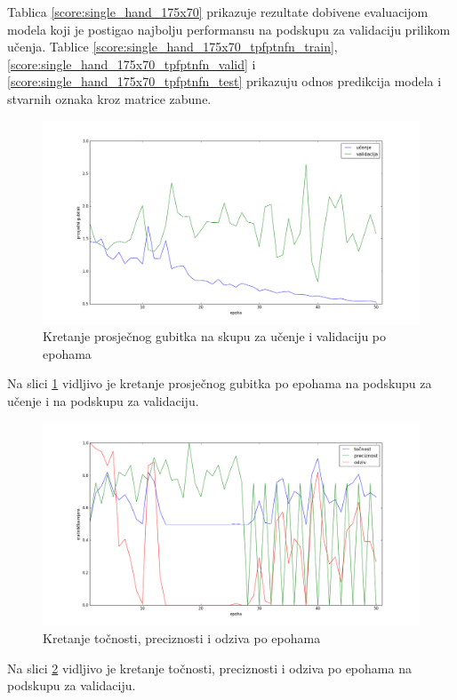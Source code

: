 \documentclass[times, utf8, diplomski, numeric]{fer}
\begin{document}
\noindent Tablica \ref{score:single_hand_175x70} prikazuje rezultate dobivene evaluacijom modela koji je postigao najbolju performansu na podskupu za validaciju prilikom učenja.
Tablice \ref{score:single_hand_175x70_tpfptnfn_train}, \ref{score:single_hand_175x70_tpfptnfn_valid} i \ref{score:single_hand_175x70_tpfptnfn_test} prikazuju odnos predikcija modela i stvarnih oznaka kroz matrice zabune.

\begin{figure}[H]
\centering
\includegraphics[scale=0.35]{images/single_hand_scale025_loss.png}
\caption{Kretanje prosječnog gubitka na skupu za učenje i validaciju po epohama}
\label{img:single_hand_scale025_loss}
\end{figure}
\noindent Na slici \ref{img:single_hand_scale025_loss} vidljivo je kretanje prosječnog gubitka po epohama na podskupu za učenje i na podskupu za validaciju.

\begin{figure}[H]
\centering
\includegraphics[scale=0.35]{images/single_hand_scale025_acc_ap.png}
\caption{Kretanje točnosti, preciznosti i odziva po epohama}
\label{img:single_hand_scale025_acc_ap}
\end{figure}
\noindent Na slici \ref{img:single_hand_scale025_acc_ap} vidljivo je kretanje točnosti, preciznosti i odziva po epohama na podskupu za validaciju.
\end{document}
